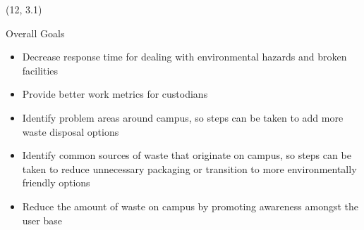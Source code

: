 \documentclass[22pt]{beamer}
\begin{document}
\begin{frame}[fragile]
\begin{textblock}{3.5}
\end{textblock}

\begin{textblock}{3.5}(12, 3.1)
\begin{block}{Overall Goals}
\begin{itemize}
\item Decrease response time for dealing with environmental hazards and broken facilities
\item Provide better work metrics for custodians
\item Identify problem areas around campus, so steps can be taken to add more waste disposal options
\item Identify common sources of waste that originate on campus, so steps can be taken to reduce unnecessary packaging or transition to more environmentally friendly options
\item Reduce the amount of waste on campus by promoting awareness amongst the user base
\end{itemize}
\end{block}


\end{textblock}
\end{frame}
\end{document}
